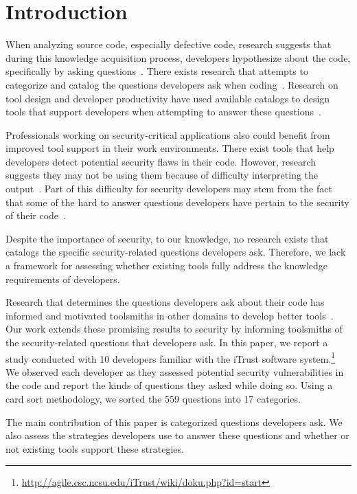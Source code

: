 \documentclass[conference]{IEEEtran}
\begin{document}
\section{Introduction}

When analyzing source code, especially defective code, research suggests that during this knowledge acquisition process, developers hypothesize about the code, specifically by asking questions~\cite{livshits2005finding, ko2004designing}. 
There exists research that attempts to categorize and catalog the questions developers ask when coding~\cite{latoza2010hard}. 
Research on tool design and developer productivity have used available catalogs to design tools that support developers when attempting to answer these questions~\cite{yoon2013visualization, servant2012history}.

 
Professionals working on security-critical applications also could benefit from improved tool support in their work environments. 
There exist tools that help developers detect potential security flaws in their code. 
However, research suggests they may not be using them because of difficulty interpreting the output~\cite{johnson2013don}. 
Part of this difficulty for security developers may stem from the fact that some of the hard to answer questions developers have pertain to the security of their code~\cite{latoza2010hard}.

Despite the importance of security, to our knowledge, no research exists that catalogs the specific security-related questions developers ask. 
Therefore, we lack a framework for assessing whether existing tools fully address the knowledge requirements of developers.

Research that determines the questions developers ask about their code has informed and motivated toolsmiths in other domains to develop better tools~\cite{kononenko2012automatically, servant2012history, yoon2013visualization}.
Our work extends these promising results to security by informing toolsmiths of the security-related questions that developers ask.
In this paper, we report a study conducted with 10 developers familiar with the iTrust software system.\footnote{\url{http://agile.csc.ncsu.edu/iTrust/wiki/doku.php?id=start}} 
We observed each developer as they assessed potential security vulnerabilities in the code and report the kinds of questions they asked while doing so. Using a card sort methodology, we sorted the 559 questions into 17 categories. 

The main contribution of this paper is categorized questions developers ask. 
We also assess the strategies developers use to answer these questions and whether or not existing tools support these strategies.
\end{document}
